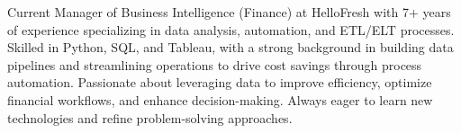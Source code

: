 

\begin{cvparagraph}

Current Manager of Business Intelligence (Finance) at HelloFresh with 7+ years of experience specializing in data analysis, automation, and ETL/ELT processes. Skilled in Python, SQL, and Tableau, with a strong background in building data pipelines and streamlining operations to drive cost savings through process automation. Passionate about leveraging data to improve efficiency, optimize financial workflows, and enhance decision-making. Always eager to learn new technologies and refine problem-solving approaches.
\end{cvparagraph}
